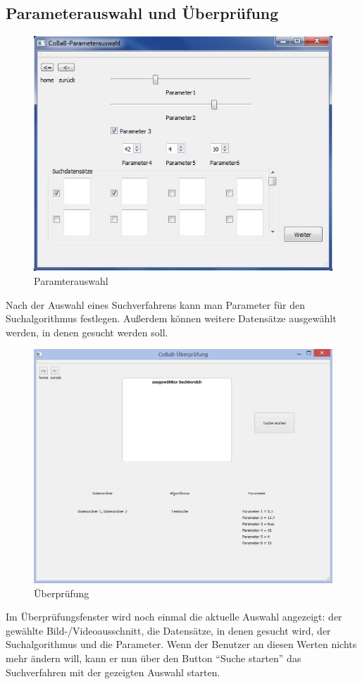 \subsection{Parameterauswahl und Überprüfung}
\begin{figure}[H]
\includegraphics[width=1\linewidth]{img/Parameterauswahl}
\caption{Paramterauswahl}
\label{fig:parameterauswahl}
\end{figure}
Nach der Auswahl eines Suchverfahrens kann man Parameter für den Suchalgorithmus festlegen. Außerdem können weitere Datensätze ausgewählt werden, in denen gesucht werden soll.

\begin{figure}[H]
\includegraphics[width=1\linewidth]{img/Ueberpruefung}
\caption{Überprüfung}
\label{fig:überprüfung}
\end{figure}
Im Überprüfungsfenster wird noch einmal die aktuelle Auswahl angezeigt: der gewählte Bild-/Videoausschnitt, die Datensätze, in denen gesucht wird, der Suchalgorithmus und die Parameter. Wenn der Benutzer an diesen Werten nichts mehr ändern will, kann er nun über den Button \enquote{Suche starten} das Suchverfahren mit der gezeigten Auswahl starten.

